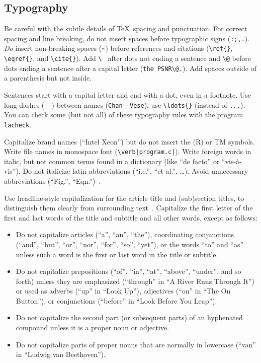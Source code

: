 \documentclass{ipol}
\begin{document}
\subsection{Typography}

Be careful with the subtle details of \TeX\ spacing and
punctuation. For correct spacing and line breaking, do not insert
spaces before typographic signs (\verb|:;,.|). \emph{Do} insert
non-breaking spaces (\verb|~|) before references and citations
(\verb|\ref{}|, \verb|\eqref{}|, and \verb|\cite{}|). Add \verb|\ |
after dots not ending a sentence and \verb|\@| before dots ending a
sentence after a capital letter (\verb|the PSNR\@.|). Add spaces
outside of a parenthesis but not inside.

Sentences start with a capital letter and end with a dot, even in a
footnote. Use long dashes (\verb|--|) between names
(\verb|Chan--Vese|), use \verb|\ldots{}| (instead of \verb|...|).
You can check some (but not all) of these typography rules with the
program \texttt{lacheck}.

Capitalize brand names (``Intel Xeon'') but do not insert the
(R) or TM symbols. Write file names in monospace font
(\verb:\verb|program.c|:). Write foreign words in italic, but not
common terms found in a dictionary (like ``de facto'' or
``vis-\`a-vis''). Do not italicize latin abbreviations (``i.e.'', ``et
al.'', \ldots{}). Avoid unnecessary abbreviations (``Fig.'',
``Eqn.'')~\cite[sec.~26.3.2]{turabian}.

Use headline-style capitalization for the article title and
(sub)section titles, to distinguish them clearly from surrounding
text~\cite[p.~314]{turabian}. Capitalize the first letter of the first
and last words of the title and subtitle and all other words, except
as follows:
\begin{itemize}
\item
  Do not capitalize articles (``a'', ``an'', ``the''), coordinating
  conjunctions (``and'', ``but'', ``or'', ``nor'', ``for'', ``so'',
  ``yet''), or the words ``to'' and ``as'' unless such a word is the
  first or last word in the title or subtitle.
\item
  Do not capitalize prepositions (``of'', ``in'', ``at'', ``above'',
  ``under'', and so forth) unless they are emphasized (``through'' in
  ``A River Runs Through It'') or used as adverbs (``up'' in ``Look
  Up''), adjectives (``on'' in ``The On Button''), or conjunctions
  (``before'' in ``Look Before You Leap'').
\item
  Do not capitalize the second part (or subsequent parts) of an
  hyphenated compound unless it is a proper noun or adjective.
\item
  Do not capitalize parts of proper nouns that are normally in lowercase
  (``van'' in ``Ludwig van Beethoven'').
\end{itemize}
\end{document}

